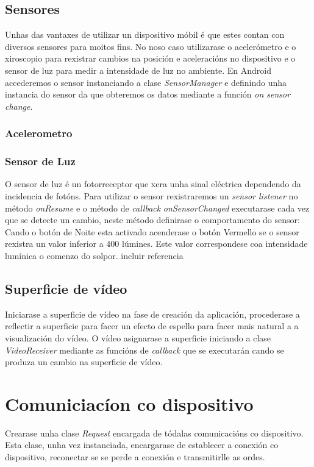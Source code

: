 \subsection{Sensores}
Unhas das vantaxes de utilizar un dispositivo móbil é que estes contan con diversos sensores para moitos fins. No noso caso utilizarase o acelerómetro e o xiroscopio para rexistrar cambios na posición e aceleracións no dispositivo e o sensor de luz para medir a intensidade de luz no ambiente.
En Android accederemos o sensor instanciando a clase \emph{SensorManager} e definindo unha instancia do sensor da que obteremos os datos mediante a función \emph{on sensor change}.
\subsubsection{Acelerometro}
\subsubsection{Sensor de Luz}
O sensor de luz é un fotorreceptor que xera unha sinal eléctrica dependendo da incidencia de fotóns. Para utilizar o sensor rexistraremos un \emph{sensor listener} no método \emph{onResume} e o método de \emph{callback} \emph{onSensorChanged} executarase cada vez que se detecte un cambio, neste método definirase o comportamento do sensor: Cando o botón de Noite esta activado acenderase o botón Vermello se o sensor rexistra un valor inferior a 400 lúmines. Este valor correspondese coa intensidade lumínica o comenzo do solpor.
incluir referencia

\subsection{Superficie de vídeo}
Iniciarase a superficie de vídeo na fase de creación da aplicación, procederase a reflectir a superficie para facer un efecto de espello para facer mais natural a a visualización do vídeo. O vídeo asignarase a superficie iniciando a clase \emph{VideoReceiver} mediante as funcións de \emph{callback} que se executarán cando se produza un cambio na superficie de vídeo.

\section{Comuniciacíon co dispositivo}
Crearase unha clase \emph{Request} encargada de tódalas comunicacións co dispositivo.  Esta clase, unha vez instanciada, encargarase de establecer a conexión co dispositivo, reconectar se se perde a conexión e transmitirlle as ordes.

